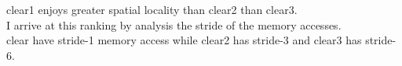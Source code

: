 \documentclass{article}
\begin{document}
clear1 enjoys greater spatial locality than clear2 than clear3. \\
I arrive at this ranking by analysis the stride of the memory accesses. \\
clear have stride-1 memory access while clear2 has stride-3 and clear3 has stride-6.
\end{document}
